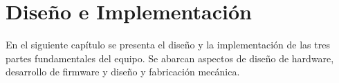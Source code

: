 
\chapter{Diseño e Implementación} %

\label{Chapter3} %
En el siguiente capítulo se presenta el diseño y la implementación de las tres partes fundamentales del equipo. Se abarcan aspectos de diseño de hardware, desarrollo de firmware y diseño y fabricación mecánica.

